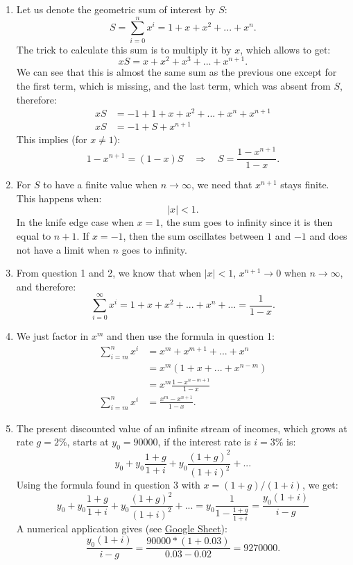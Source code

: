 \documentclass[]{book}
\theoremstyle{definition}
\theoremstyle{definition}
\theoremstyle{definition}
\theoremstyle{remark}
\begin{document}
\begin{enumerate}
\def\labelenumi{\arabic{enumi}.}
\item
  Let us denote the geometric sum of interest by \(S\):
  \[S=\sum_{i=0}^n x^i = 1+x+x^2+...+x^n.\] The trick to calculate this
  sum is to multiply it by \(x\), which allows to get:
  \[xS=x+x^2+x^3+...+x^{n+1}.\] We can see that this is almost the same
  sum as the previous one except for the first term, which is missing,
  and the last term, which was absent from \(S\), therefore:
  \[\begin{aligned}
  xS&=-1+1+x+x^2+...+x^n+x^{n+1}\\
  xS&=-1+S+x^{n+1}
  \end{aligned}\] This implies (for \(x\neq1\)):
  \[1-x^{n+1}=(1-x)S \quad \Rightarrow \quad S=\frac{1-x^{n+1}}{1-x}.\]
\item
  For \(S\) to have a finite value when \(n \to \infty\), we need that
  \(x^{n+1}\) stays finite. This happens when: \[\lvert x\rvert<1.\] In
  the knife edge case when \(x=1\), the sum goes to infinity since it is
  then equal to \(n+1\). If \(x=-1\), then the sum oscillates between
  \(1\) and \(-1\) and does not have a limit when \(n\) goes to
  infinity.
\item
  From question 1 and 2, we know that when \(\lvert x\rvert<1\),
  \(x^{n+1} \to 0\) when \(n \to \infty\), and therefore:
  \[\sum_{i=0}^{\infty} x^i = 1+x+x^2+...+x^n+...=\frac{1}{1-x}.\]
\item
  We just factor in \(x^m\) and then use the formula in question 1:
  \[\begin{aligned}
  \sum_{i=m}^n x^i &= x^m+x^{m+1}+...+x^n\\
  &=x^m\left(1+x+...+x^{n-m}\right)\\
  &=x^m\frac{1-x^{n-m+1}}{1-x}\\
  \sum_{i=m}^n x^i &=\frac{x^m - x^{n+1}}{1-x}.
  \end{aligned}\]
\item
  The present discounted value of an infinite stream of incomes, which
  grows at rate \(g=2\)\%, starts at \(y_0=90000\), if the interest rate
  is \(i=3\)\% is:
  \[y_0+y_0\frac{1+g}{1+i}+y_0\frac{(1+g)^2}{(1+i)^2} + ...\] Using the
  formula found in question 3 with \(x=(1+g)/(1+i)\), we get:
  \[y_0+y_0\frac{1+g}{1+i}+y_0\frac{(1+g)^2}{(1+i)^2} + ...=y_0\dfrac{1}{1-\frac{1+g}{1+i}}=\frac{y_0(1+i)}{i-g}\]
  A numerical application gives (see
  \href{https://docs.google.com/spreadsheets/d/108I8xuosIQvgU6wOGrfwzHhE4p1OStgv8iIpzZ-4vME/edit?usp=sharing}{Google
  Sheet}):
  \[\frac{y_0(1+i)}{i-g}=\frac{90000 *(1+0.03)}{0.03-0.02}=9270000.\]
\end{enumerate}
\end{document}
